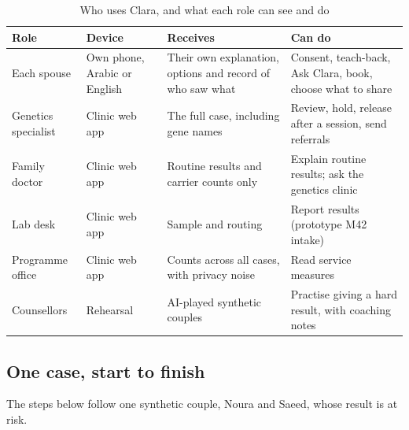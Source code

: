 \documentclass[10.5pt,a4paper]{article}
\newcommand{\thead}[1]{\textbf{#1}}
\newcommand{\toprl}{\arrayrulecolor{ink}\toprule\arrayrulecolor{rule}}
\begin{document}
{\small
\begin{xltabular}{\textwidth}{@{}P{2.7cm}P{2.3cm}LL@{}}
\caption{Who uses Clara, and what each role can see and do}\\
\toprl
\thead{Role} & \thead{Device} & \thead{Receives} & \thead{Can do}\\
\midrule
Each spouse & Own phone, Arabic or English & Their own explanation, options and record of who saw what & Consent, teach-back, Ask Clara, book, choose what to share\\
\midrule
Genetics specialist & Clinic web app & The full case, including gene names & Review, hold, release after a session, send referrals\\
\midrule
Family doctor & Clinic web app & Routine results and carrier counts only & Explain routine results; ask the genetics clinic\\
\midrule
Lab desk & Clinic web app & Sample and routing & Report results (prototype M42 intake)\\
\midrule
Programme office & Clinic web app & Counts across all cases, with privacy noise & Read service measures\\
\midrule
Counsellors & Rehearsal & AI-played synthetic couples & Practise giving a hard result, with coaching notes\\
\bottomrule
\end{xltabular}}

\subsection{One case, start to finish}

The steps below follow one synthetic couple, Noura and Saeed, whose result is at risk.
\end{document}
